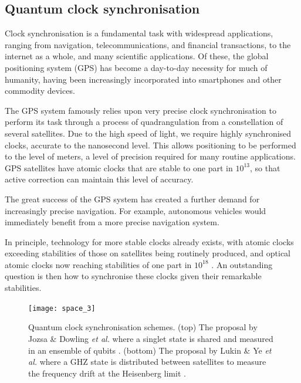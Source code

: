 %
%

\subsection{Quantum clock synchronisation} \label{sec:clock_sync}

Clock synchronisation is a fundamental task with widespread applications, ranging from navigation, telecommunications, and financial transactions, to the internet as a whole, and many scientific applications. Of these, the global positioning system (GPS) has become a day-to-day necessity for much of humanity, having been increasingly incorporated into smartphones and other commodity devices.

The GPS system famously relies upon very precise clock synchronisation to perform its task through a process of quadrangulation from a constellation of several satellites. Due to the high speed of light, we require highly synchronised clocks, accurate to the nanosecond level. This allows positioning to be performed to the level of meters, a level of precision required for many routine applications. GPS satellites have atomic clocks that are stable to one part in $10^{13}$, so that active correction can maintain this level of accuracy.

The great success of the GPS system has created a further demand for increasingly precise navigation. For example, autonomous vehicles would immediately benefit from a more precise navigation system.

In principle, technology for more stable clocks already exists, with atomic clocks exceeding stabilities of those on satellites being routinely produced, and optical atomic clocks now reaching stabilities of one part in $10^{18}$ \cite{bib:ludlow2015optical}. An outstanding question is then how to synchronise these clocks given their remarkable stabilities. 

\begin{figure}[!htbp]
\texttt{[image: space\_3]}
\caption{Quantum clock synchronisation schemes. (top) The proposal by Jozsa \& Dowling \textit{et al.} where a singlet state is shared and measured in an ensemble of qubits \cite{bib:jozsa00}. (bottom) The proposal by Lukin \& Ye \textit{et al.} where a GHZ state is distributed between satellites to measure the frequency drift at the Heisenberg limit \cite{bib:komar14}.}
\label{fig:space_3}
\end{figure}

